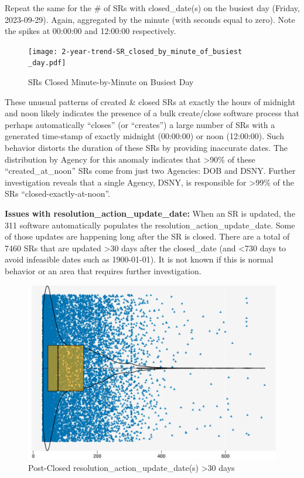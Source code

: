 \documentclass[12pt, titlepage]{article}
\begin{document}
Repeat the same for the \# of SRs with closed\_date(s) 
on the busiest day (Friday, 2023-09-29). Again, aggregated by 
the minute (with seconds equal to zero). Note the spikes 
at 00:00:00 and 12:00:00 respectively. 


\begin{figure}[tbp]
	\centering
	\texttt{[image: 2-year-trend-SR\_closed\_by\_minute\_of\_busiest\\\_day.pdf]}
	\caption{SRs Closed Minute-by-Minute on Busiest Day}
	\label{fig:busiestclosed}
\end{figure}	


These unusual patterns of created \& closed SRs at exactly the hours 
of midnight and noon likely indicates the presence of a bulk create/close 
software process that perhaps automatically ``closes'' 
(or ``creates'') a large number of SRs with a generated time-stamp of exactly 
midnight (00:00:00) or noon (12:00:00). Such behavior distorts
 the duration of these SRs by providing inaccurate dates. The 
 distribution by Agency for this anomaly indicates 
 that \textgreater90\% of these ``created\_at\_noon'' SRs come from 
 just two Agencies: DOB and DSNY.  Further investigation
 reveals that  a single Agency, DSNY, is responsible 
 for \textgreater99\% of the SRs ``closed-exactly-at-noon''. 
	

\label{sec: resolutionaction}
\textbf{Issues with resolution\_action\_update\_date:} When an 
SR is updated, the 311 software automatically 
populates the resolution\_action\_update\_date. Some of 
those  updates are happening long after the SR is 
closed. There are a total of 7460 SRs that are updated \textgreater30 days 
after the closed\_date (and \textless{}730 days to avoid infeasible 
dates such as 1900-01-01). It is not known if this is normal behavior
 or an area that requires further investigation. 
	
	
\begin{figure}[tbp]
	\centering
	\includegraphics[width = \textwidth]{post_closed_violin_chart.pdf}
	\caption{Post-Closed resolution\_action\_update\_date(s) \textgreater30 days}
	\label{fig:resolution-violin}
\end{figure}		
\end{document}
